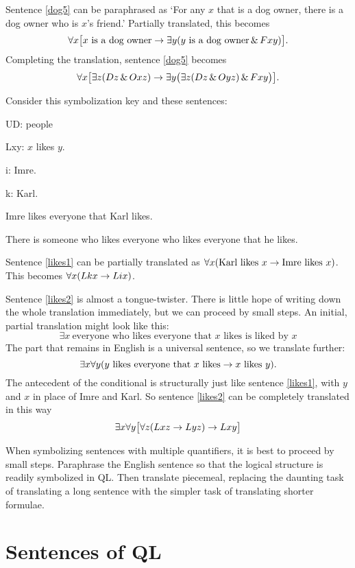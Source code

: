 Sentence \ref{dog5} can be paraphrased as `For any $x$ that is a dog owner, there is a dog owner who is $x$'s friend.' Partially translated, this becomes $$\forall x\bigl[\mbox{$x$ is a dog owner}\rightarrow\exists y(\mbox{$y$ is a dog owner}\,\&\, Fxy)\bigr].$$ Completing the translation, sentence \ref{dog5} becomes $$\forall x\bigl[\exists z(Dz \,\&\, Oxz)\rightarrow\exists y\bigl(\exists z(Dz \,\&\, Oyz)\,\&\, Fxy\bigr)\bigr].$$

Consider this symbolization key and these sentences:
\begin{ekey}
\item[UD:] people
\item[Lxy:] $x$ likes $y$.
\item[i:] Imre.
\item[k:] Karl.
\end{ekey}
\begin{earg}
\item[\ex{likes1}]Imre likes everyone that Karl likes.
\item[\ex{likes2}]There is someone who likes everyone who likes everyone that he likes.
\end{earg}

Sentence \ref{likes1} can be partially translated as $\forall x(\mbox{Karl likes $x$}\rightarrow\mbox{Imre likes $x$})$. This becomes $\forall x(Lkx\rightarrow Lix)$.


Sentence \ref{likes2} is almost a tongue-twister. There is little hope of writing down the whole translation immediately, but we can proceed by small steps. An initial, partial translation might look like this: $$\exists x\ \mbox{everyone who likes everyone that $x$ likes is liked by $x$}$$
The part that remains in English is a universal sentence, so we translate further: $$\exists x\forall y(\mbox{$y$ likes everyone that $x$ likes}\rightarrow\mbox{$x$ likes $y$}).$$
The antecedent of the conditional is structurally just like sentence \ref{likes1}, with $y$ and $x$ in place of Imre and Karl. So sentence \ref{likes2} can be completely translated in this way $$\exists x\forall y\bigl[\forall z(Lxz \rightarrow Lyz) \rightarrow Lxy\bigr]$$

When symbolizing sentences with multiple quantifiers, it is best to proceed by small steps. Paraphrase the English sentence so that the logical structure is readily symbolized in QL. Then translate piecemeal, replacing the daunting task of translating a long sentence with the simpler task of translating shorter formulae.




\section{Sentences of QL}

